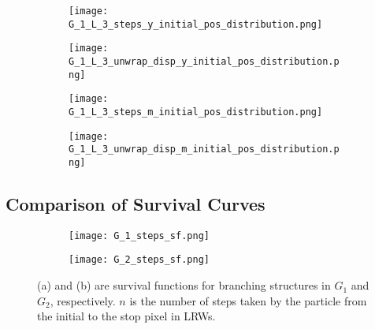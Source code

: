    \begin{figure}
        \centering
        \begin{subfigure}[b]{0.45\textwidth}
          \texttt{[image: G\_1\_L\_3\_steps\_y\_initial\_pos\_distribution.png]}
          \caption{}
          \label{fig:G_1_L_3_steps_yellow_initial_pos_distribution}
        \end{subfigure}
        
        \begin{subfigure}[b]{0.45\textwidth}
          \texttt{[image: G\_1\_L\_3\_unwrap\_disp\_y\_initial\_pos\_distribution.png]}
          \caption{}
          \label{fig:G_1_L_3_disp_yellow_initial_pos_distribution}
        \end{subfigure}
        \caption{}
        \label{fig:G_1_L_3_steps_disp_yellow}
   \end{figure}




   \begin{figure}
        \centering
        \begin{subfigure}[b]{0.45\textwidth}
          \texttt{[image: G\_1\_L\_3\_steps\_m\_initial\_pos\_distribution.png]}
          \caption{}
          \label{fig:G_1_L_3_steps_pink_initial_pos_distribution}
        \end{subfigure}
        
        \begin{subfigure}[b]{0.45\textwidth}
          \texttt{[image: G\_1\_L\_3\_unwrap\_disp\_m\_initial\_pos\_distribution.png]}
          \caption{}
          \label{fig:G_1_L_3_disp_pink_initial_pos_distribution}
        \end{subfigure}
        \caption{}
        \label{fig:G_1_L_3_steps_pink_yellow}
   \end{figure}

   

   
   
\subsection{Comparison of Survival Curves}


  \begin{figure}
        \centering 
        \begin{subfigure}[b]{0.45\textwidth}
          \texttt{[image: G\_1\_steps\_sf.png]}
          \caption{}
          \label{fig:sf_g1_branch_steps}
        \end{subfigure}
        \hfill
        \begin{subfigure}[b]{0.45\textwidth}
          \texttt{[image: G\_2\_steps\_sf.png]}
          \caption{}
          \label{fig:sf_g2_branch_steps}
        \end{subfigure}
        \caption{(a) and (b) are survival functions for branching
          structures in $G_1$ and $G_2$, respectively. $n$ is the
          number of steps taken by the particle from the initial to
          the stop pixel in LRWs.}
        \label{fig:sf_branch_steps}
  \end{figure}

